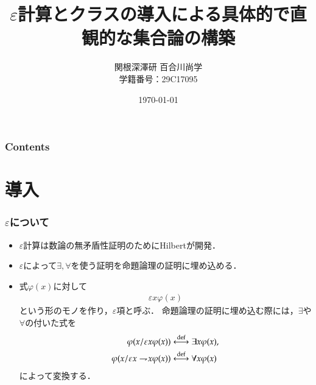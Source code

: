 \documentclass[dvipdfmx,10pt,notheorems]{beamer}
\title{$\varepsilon$計算とクラスの導入による具体的で直観的な集合論の構築}%
\author{関根深澤研 百合川尚学 \\ 学籍番号：29C17095}%
\institute{}%
\date{\today}%
\theoremstyle{definition}
\newcommand{\defarrow}{\overset{\mathrm{def}}{\longleftrightarrow}} %
\newcommand{\negation}{\rightharpoondown\hspace{-0.25em}} %
\begin{document}

\begin{frame}[plain]\frametitle{}
\titlepage %
\end{frame}

\begin{frame}\frametitle{Contents}
\tableofcontents %
\end{frame}

\section{導入}

\begin{frame}\frametitle{$\varepsilon$について}
	\begin{itemize}
		\item $\varepsilon$計算は数論の無矛盾性証明のためにHilbert\cite{Hilbert}が開発．
		
		\item $\varepsilon$によって$\exists,\forall$を使う証明を命題論理の証明に埋め込める．
		
		\item 式$\varphi(x)$に対して
			\begin{align}
				\varepsilon x \varphi(x)
			\end{align}
			という形のモノを作り，$\varepsilon$項と呼ぶ．
			命題論理の証明に埋め込む際には，$\exists$や$\forall$の付いた式を
			\begin{align}
				\varphi(x/\varepsilon x \varphi(x)) &\defarrow \exists x \varphi(x), \\
				\varphi(x/\varepsilon x \negation x \varphi(x)) &\defarrow \forall x \varphi(x)
			\end{align}
			によって変換する．
	\end{itemize}
\end{frame}
\end{document}
